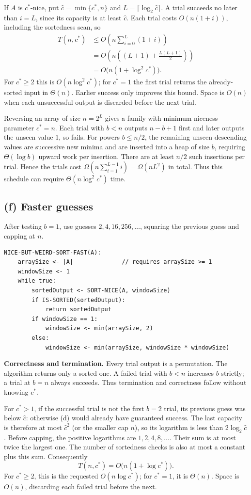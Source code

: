 \documentclass[11pt,a4paper]{article}
\newcommand{\parttitle}[1]{\Needspace{10\baselineskip}\subsection*{#1}}
\begin{document}
If $A$ is $c^*$-nice, put $\widehat c=\min\{c^*,n\}$ and $L=\lceil\log_2\widehat c\rceil$. A trial succeeds no later than $i=L$, since its capacity is at least $\widehat c$. Each trial costs $O(n(1+i))$, including the sortedness scan, so
\[
\begin{aligned}
T(n,c^*)&\le O\!\left(n\sum_{i=0}^{L}(1+i)\right)\\
&=O\!\left(n\left((L+1)+\frac{L(L+1)}2\right)\right)\\
&=\boxed{O\bigl(n(1+\log^2 c^*)\bigr)}.
\end{aligned}
\]
For $c^*\ge2$ this is $O(n\log^2 c^*)$; for $c^*=1$ the first trial returns the already-sorted input in $\Theta(n)$. Earlier success only improves this bound. Space is $O(n)$ when each unsuccessful output is discarded before the next trial.

Reversing an array of size $n=2^L$ gives a family with minimum niceness parameter $c^*=n$. Each trial with $b<n$ outputs $n-b+1$ first and later outputs the unseen value 1, so fails. For powers $b\le n/2$, the remaining unseen descending values are successive new minima and are inserted into a heap of size $b$, requiring $\Theta(\log b)$ upward work per insertion. There are at least $n/2$ such insertions per trial. Hence the trials cost $\Omega(n\sum_{i=1}^{L-1}i)=\Omega(nL^2)$ in total. Thus this schedule can require $\Theta(n\log^2 c^*)$ time.

\newpage
\parttitle{(f) Faster guesses}
After testing $b=1$, use guesses $2,4,16,256,\ldots$, squaring the previous guess and capping at $n$.
\begin{lstlisting}
NICE-BUT-WEIRD-SORT-FAST(A):
    arraySize <- |A|              // requires arraySize >= 1
    windowSize <- 1
    while true:
        sortedOutput <- SORT-NICE(A, windowSize)
        if IS-SORTED(sortedOutput):
            return sortedOutput
        if windowSize == 1:
            windowSize <- min(arraySize, 2)
        else:
            windowSize <- min(arraySize, windowSize * windowSize)
\end{lstlisting}
\textbf{Correctness and termination.} Every trial output is a permutation. The algorithm returns only a sorted one. A failed trial with $b<n$ increases $b$ strictly; a trial at $b=n$ always succeeds. Thus termination and correctness follow without knowing $c^*$.

For $c^*>1$, if the successful trial is not the first $b=2$ trial, its previous guess was below $\widehat c$: otherwise (d) would already have guaranteed success. The last capacity is therefore at most $\widehat c^2$ (or the smaller cap $n$), so its logarithm is less than $2\log_2\widehat c$. Before capping, the positive logarithms are $1,2,4,8,\ldots$. Their sum is at most twice the largest one. The number of sortedness checks is also at most a constant plus this sum. Consequently
\[
\boxed{T(n,c^*)=O\bigl(n(1+\log c^*)\bigr)}.
\]
For $c^*\ge2$, this is the requested $O(n\log c^*)$; for $c^*=1$, it is $\Theta(n)$. Space is $O(n)$, discarding each failed trial before the next.
\end{document}
